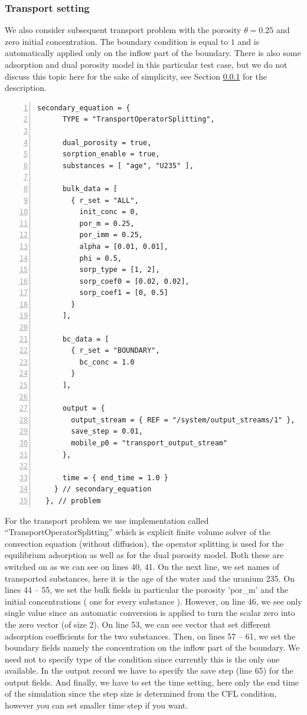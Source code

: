 \documentclass[12pt,a4paper]{report}
\begin{document}
\subsubsection{Transport setting}
We also consider subsequent transport problem with the porosity $\theta = 0.25$ and zero initial concentration. The boundary condition is equal to $1$ and is automatically applied only on the 
inflow part of the boundary. There is also some adsorption and dual porosity model in this particular test case, but we do not discuss this topic here for the sake of simplicity,
see Section \ref{} for the description. 

\begin{Verbatim}[numbers=left, firstnumber=last]
     secondary_equation = {
      TYPE = "TransportOperatorSplitting", 

      dual_porosity = true, 
      sorption_enable = true, 
      substances = [ "age", "U235" ],
      
      bulk_data = [
        { r_set = "ALL",
          init_conc = 0,
          por_m = 0.25,
          por_imm = 0.25,
          alpha = [0.01, 0.01],
          phi = 0.5,
          sorp_type = [1, 2],
          sorp_coef0 = [0.02, 0.02],
          sorp_coef1 = [0, 0.5]
        }
      ],
      
      bc_data = [
        { r_set = "BOUNDARY",
          bc_conc = 1.0
        }
      ],

      output = {
        output_stream = { REF = "/system/output_streams/1" },
        save_step = 0.01,
        mobile_p0 = "transport_output_stream"
      }, 

      time = { end_time = 1.0 }
    } // secondary_equation
  }, // problem
\end{Verbatim}
For the transport problem we use implementation called ``TransportOperatorSplitting'' which is explicit finite volume solver of the convection equation (without diffusion), 
the operator splitting is used for the equilibrium adsorption as well as for the dual porosity model. Both these are switched on as we can see on lines 40, 41. On the next line, 
we set names of transported substances, here it is the age of the water and the uranium 235. On lines 44 -- 55, we set the bulk fields in particular the porosity 'por\_m' and the initial concentrations 
( one for every substance ). However, on line 46, we see only single value since an automatic conversion is applied to turn the scalar zero into the zero vector (of size 2). 
On line 53, we can see vector that set different adsorption coefficients for the two substances. Then, on lines 57 -- 61, we set the boundary fields namely the concentration on the inflow part of the boundary.
We need not to specify type of the condition since currently this is the only one available. In the output record we have to specify the save step (line 65) for the output fields. And finally,
we have to set the time setting, here only the end time of the simulation since the step size is determined from the CFL condition, however you can set smaller time step if you want.
\end{document}

